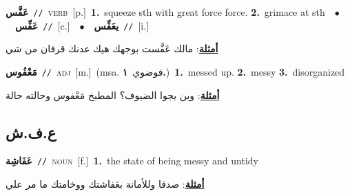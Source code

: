 \documentclass[10pt,a4paper,twoside]{article} %
\begin{document}
\begin{multicols}{2}
{\setlength\topsep{0pt}\textbf{\foreignlanguage{arabic}{عَفَّس}}\ {\color{gray}\texttt{//}\color{black}}\ \textsc{verb}\ [p.]\ \textbf{1.}~squeeze sth with great force force.  \textbf{2.}~grimace at sth\ \ $\bullet$\ \ \setlength\topsep{0pt}\textbf{\foreignlanguage{arabic}{عَفِّس}}\ {\color{gray}\texttt{//}\color{black}}\ [c.]\ \ $\bullet$\ \ \setlength\topsep{0pt}\textbf{\foreignlanguage{arabic}{يعَفِّس}}\ {\color{gray}\texttt{//}\color{black}}\ [i.]\  \begin{flushright}\color{gray}\foreignlanguage{arabic}{\textbf{\underline{\foreignlanguage{arabic}{أمثلة}}}: مالك عَفَّست بوجهك هيك عدنك قرفان من شي}\end{flushright}\color{black}} \vspace{2mm}

{\setlength\topsep{0pt}\textbf{\foreignlanguage{arabic}{مَعْفُوس}}\ {\color{gray}\texttt{//}\color{black}}\ \textsc{adj}\ [m.]\ \color{gray}(msa. \foreignlanguage{arabic}{فوضوي}~\foreignlanguage{arabic}{\textbf{١.}})\color{black}\ \textbf{1.}~messed up.  \textbf{2.}~messy  \textbf{3.}~disorganized\  \begin{flushright}\color{gray}\foreignlanguage{arabic}{\textbf{\underline{\foreignlanguage{arabic}{أمثلة}}}: وين يجوا الضيوف؟ المطبخ مَعْفوس وحالته حالة}\end{flushright}\color{black}} \vspace{2mm}

\vspace{-3mm}
\subsection*{\color{blue}\foreignlanguage{arabic}{ع.ف.ش}\color{blue}{}} 

{\setlength\topsep{0pt}\textbf{\foreignlanguage{arabic}{عَفَاشِة}}\ {\color{gray}\texttt{//}\color{black}}\ \textsc{noun}\ [f.]\ \textbf{1.}~the state of being messy and untidy\  \begin{flushright}\color{gray}\foreignlanguage{arabic}{\textbf{\underline{\foreignlanguage{arabic}{أمثلة}}}: صدقا وللأمانة بعَفاشتك ووخامتك ما مر علي}\end{flushright}\color{black}} \vspace{2mm}


\end{multicols}
\end{document}
